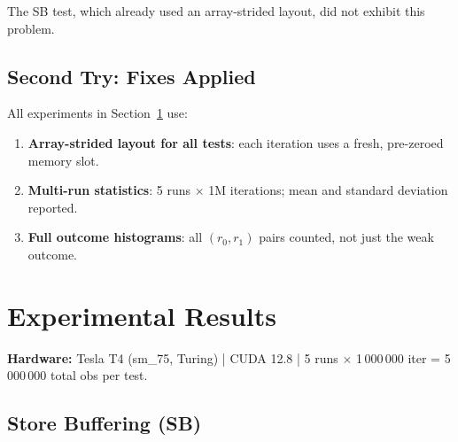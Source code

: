 \documentclass[a4paper]{article}
\begin{document}
The SB test, which already used an array-strided layout, did not exhibit this problem.

\subsection{Second Try: Fixes Applied}

All experiments in Section~\ref{sec:results} use:
\begin{enumerate}
  \item \textbf{Array-strided layout for all tests}: each iteration uses a fresh, pre-zeroed memory slot.
  \item \textbf{Multi-run statistics}: 5 runs $\times$ 1M iterations; mean and standard deviation reported.
  \item \textbf{Full outcome histograms}: all $(r_0, r_1)$ pairs counted, not just the weak outcome.
\end{enumerate}

\section{Experimental Results}
\label{sec:results}

\textbf{Hardware:} Tesla T4 (sm\_75, Turing) | CUDA 12.8 | 5 runs $\times$ 1\,000\,000 iter = 5\,000\,000 total obs per test.

\subsection{Store Buffering (SB)}
\end{document}

